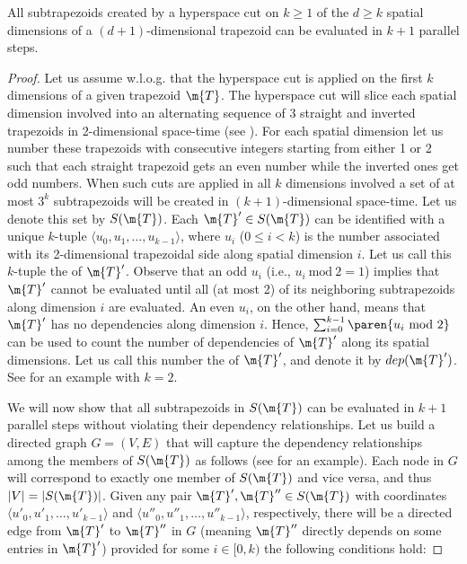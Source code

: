 \begin{lemma}
All subtrapezoids created by a hyperspace cut 
on $k \geq 1$ of the $d \geq k$ spatial dimensions
of a $(d + 1)$-dimensional trapezoid can be evaluated 
in $k + 1$ parallel steps.
\label{lem:simParallelStepsNew}
\end{lemma}
%
\begin{proof}
%
Let us assume w.l.o.g. that the hyperspace cut 
is applied on the first $k$ dimensions of a given
trapezoid $\m{T}$. The hyperspace cut will slice each spatial 
dimension involved into an alternating sequence of 
3 straight and inverted trapezoids 
in 2-dimensional space-time (see ). 
For each spatial dimension let us number these trapezoids with 
consecutive integers starting from either 1 or 2 such
that each straight trapezoid gets an even number while
the inverted ones get odd numbers.
When such cuts are applied in all $k$ dimensions involved
a set of at most $3^{k}$ subtrapezoids
will be created in $(k + 1)$-dimensional space-time.
Let us denote this set by $S(\m{T})$.
Each $\m{T}' \in S(\m{T})$ can be identified
with a unique $k$-tuple $\langle u_0, u_1, \ldots, 
u_{k - 1} \rangle$, where $u_i$ ($0 \leq i < k$) 
is the number associated with its 2-dimensional 
trapezoidal side along spatial dimension $i$.
Let us call this $k$-tuple the 
of $\m{T}'$. Observe that an odd $u_i$ 
(i.e., $u_i ~\textrm{mod}~ 2 = 1$)
implies that $\m{T}'$ cannot be evaluated until 
all (at most 2) of its neighboring subtrapezoids 
along dimension $i$ are evaluated. An even
$u_i$, on the other hand, means that $\m{T}'$
has no dependencies along dimension $i$. 
Hence, $\sum_{i = 0}^{k - 1}{\paren{u_i ~\textrm{mod}~ 2}}$
can be used to count the number of dependencies
of $\m{T}'$ along its spatial dimensions.
Let us call this number the 
of $\m{T}'$, and denote it by $dep(\m{T}')$.
See  for an example
with $k = 2$.

We will now show that all subtrapezoids
in $S(\m{T})$ can be evaluated in $k + 1$ parallel
steps without violating their dependency
relationships. Let us build a directed graph
$G = (V, E)$ that will capture the dependency
relationships among the members of $S(\m{T})$
as follows (see 
for an example). Each node in $G$ will correspond to
exactly one member of $S(\m{T})$ and vice versa, 
and thus $|V| = |S(\m{T})|$. Given any pair 
$\m{T}', \m{T}'' \in S(\m{T})$ with
coordinates $\langle u'_0, u'_1, \ldots, 
u'_{k - 1} \rangle$ and $\langle u''_0, u''_1, \ldots, 
u''_{k - 1} \rangle$, respectively,
there will be a directed edge from
$\m{T}'$ to $\m{T}''$ in $G$ (meaning
$\m{T}''$ directly depends on some entries
in $\m{T}'$) provided for some $i \in [0, k)$ 
the following conditions hold: 


\end{proof}
